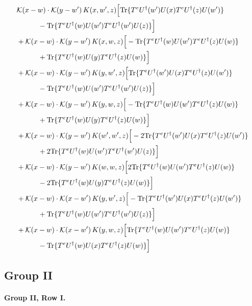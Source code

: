 \documentclass[10pt]{article}
\numberwithin{equation}{section}
\begin{document}
\begin{align}
&\mathcal K(x-w)\cdot\mathcal K(y-w')\,K(x,w',z)\Big[{\rm Tr}\{T^eU^\dagger(w')U(x)T^eU^\dagger(z)U(w')\}\notag\\
&\quad\quad\quad-{\rm Tr}\{T^eU^\dagger(w)U(w')T^eU^\dagger(w')U(z)\}\Big]\notag\\
&+\mathcal K(x-w)\cdot\mathcal K(y-w')\,K(x,w,z)\Big[-{\rm Tr}\{T^eU^\dagger(w)U(w')T^eU^\dagger(z)U(w)\}\notag\\
&\quad\quad\quad+{\rm Tr}\{T^eU^\dagger(w)U(y)T^eU^\dagger(z)U(w)\}\Big]\notag\\
&+\mathcal K(x-w)\cdot\mathcal K(y-w')\,K(y,w',z)\Big[{\rm Tr}\{T^eU^\dagger(w')U(x)T^eU^\dagger(z)U(w')\}\notag\\
&\quad\quad\quad-{\rm Tr}\{T^eU^\dagger(w)U(w')T^eU^\dagger(w')U(z)\}\Big]\notag\\
&+\mathcal K(x-w)\cdot\mathcal K(y-w')\,K(y,w,z)\Big[-{\rm Tr}\{T^eU^\dagger(w)U(w')T^eU^\dagger(z)U(w)\}\notag\\
&\quad\quad\quad+{\rm Tr}\{T^eU^\dagger(w)U(y)T^eU^\dagger(z)U(w)\}\Big]\notag\\
&+\mathcal K(x-w)\cdot\mathcal K(y-w')\,K(w',w',z)\Big[-2{\rm Tr}\{T^eU^\dagger(w')U(x)T^eU^\dagger(z)U(w')\}\notag\\
&\quad\quad\quad+2{\rm Tr}\{T^eU^\dagger(w)U(w')T^eU^\dagger(w')U(z)\}\Big]\notag\\
&+\mathcal K(x-w)\cdot\mathcal K(y-w')\,K(w,w,z)\Big[2{\rm Tr}\{T^eU^\dagger(w)U(w')T^eU^\dagger(z)U(w)\}\notag\\
&\quad\quad\quad-2{\rm Tr}\{T^eU^\dagger(w)U(y)T^eU^\dagger(z)U(w)\}\Big]\notag\\
&+\mathcal K(x-w)\cdot\mathcal K(x-w')\,K(y,w',z)\Big[-{\rm Tr}\{T^eU^\dagger(w')U(x)T^eU^\dagger(z)U(w')\}\notag\\
&\quad\quad\quad+{\rm Tr}\{T^eU^\dagger(w)U(w')T^eU^\dagger(w')U(z)\}\Big]\notag\\
&+\mathcal K(x-w)\cdot\mathcal K(x-w')\,K(y,w,z)\Big[{\rm Tr}\{T^eU^\dagger(w)U(w')T^eU^\dagger(z)U(w)\}\notag\\
&\quad\quad\quad-{\rm Tr}\{T^eU^\dagger(w)U(x)T^eU^\dagger(z)U(w)\}\Big]
\label{eq:G1V}
\end{align}

\subsection{Group II}

\paragraph{Group II, Row I.}
\end{document}

